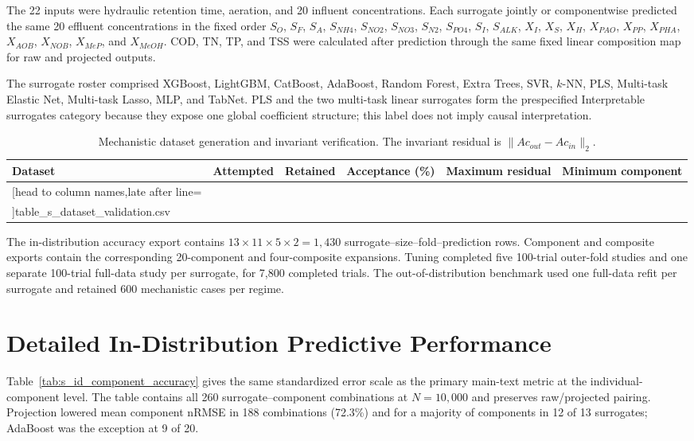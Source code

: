 \documentclass[a4paper,10pt]{article}
\newcommand{\csvrowssix}[1]{%
  \csvreader[head to column names,late after line=\\]{#1}{}{\colA & \colB & \colC & \colD & \colE & \colF}}
\begin{document}
The 22 inputs were hydraulic retention time, aeration, and 20 influent concentrations. Each surrogate jointly or componentwise predicted the same 20 effluent concentrations in the fixed order $S_O$, $S_F$, $S_A$, $S_{NH4}$, $S_{NO2}$, $S_{NO3}$, $S_{N2}$, $S_{PO4}$, $S_I$, $S_{ALK}$, $X_I$, $X_S$, $X_H$, $X_{PAO}$, $X_{PP}$, $X_{PHA}$, $X_{AOB}$, $X_{NOB}$, $X_{MeP}$, and $X_{MeOH}$. COD, TN, TP, and TSS were calculated after prediction through the same fixed linear composition map for raw and projected outputs.

The surrogate roster comprised XGBoost, LightGBM, CatBoost, AdaBoost, Random Forest, Extra Trees, SVR, $k$-NN, PLS, Multi-task Elastic Net, Multi-task Lasso, MLP, and TabNet. PLS and the two multi-task linear surrogates form the prespecified Interpretable surrogates category because they expose one global coefficient structure; this label does not imply causal interpretation.

\begin{table}[htbp]
\centering
\caption{Mechanistic dataset generation and invariant verification. The invariant residual is $\|Ac_{out}-Ac_{in}\|_2$.}
\label{tab:s_dataset_validation}
\small
\begin{tabular}{lrrrrr}
\toprule
Dataset & Attempted & Retained & Acceptance (\%) & Maximum residual & Minimum component \\
\midrule
\csvrowssix{table_s_dataset_validation.csv}
\bottomrule
\end{tabular}
\end{table}

The in-distribution accuracy export contains $13\times11\times5\times2=1{,}430$ surrogate--size--fold--prediction rows. Component and composite exports contain the corresponding 20-component and four-composite expansions. Tuning completed five 100-trial outer-fold studies and one separate 100-trial full-data study per surrogate, for 7,800 completed trials. The out-of-distribution benchmark used one full-data refit per surrogate and retained 600 mechanistic cases per regime.

\section{Detailed In-Distribution Predictive Performance}

Table~\ref{tab:s_id_component_accuracy} gives the same standardized error scale as the primary main-text metric at the individual-component level. The table contains all 260 surrogate--component combinations at $N=10{,}000$ and preserves raw/projected pairing. Projection lowered mean component nRMSE in 188 combinations (72.3\%) and for a majority of components in 12 of 13 surrogates; AdaBoost was the exception at 9 of 20.
\end{document}
